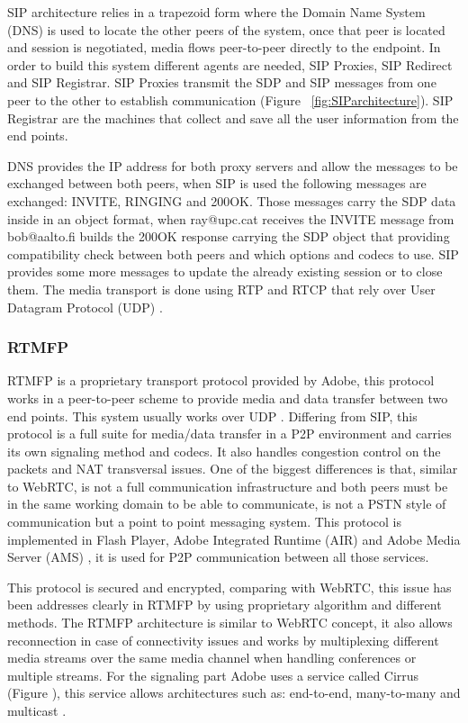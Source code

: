 SIP architecture relies in a trapezoid form where the Domain Name System (DNS) is used to locate the other peers of the system, once that peer is located and session is negotiated, media flows peer-to-peer directly to the endpoint. In order to build this system different agents are needed, SIP Proxies, SIP Redirect and SIP Registrar. SIP Proxies transmit the SDP and SIP messages from one peer to the other to establish communication (Figure ~\ref{fig:SIParchitecture}). SIP Registrar are the machines that collect and save all the user information from the end points.

DNS provides the IP address for both proxy servers and allow the messages to be exchanged between both peers, when SIP is used the following messages are exchanged: INVITE, RINGING and 200OK. Those messages carry the SDP data inside in an object format, when ray@upc.cat receives the INVITE message from bob@aalto.fi builds the 200OK response carrying the SDP object that providing compatibility check between both peers and which options and codecs to use. SIP provides some more messages to update the already existing session or to close them. The media transport is done using RTP and RTCP that rely over User Datagram Protocol (UDP) \cite{sipRFC}.

\subsubsection{RTMFP}

RTMFP is a proprietary transport protocol provided by Adobe, this protocol works in a peer-to-peer scheme to provide media and data transfer between two end points. This system usually works over UDP \cite{rtmfpSIP}. Differing from SIP, this protocol is a full suite for media/data transfer in a P2P environment and carries its own signaling method and codecs. It also handles congestion control on the packets and NAT transversal issues. One of the biggest differences is that, similar to WebRTC, is not a full communication infrastructure and both peers must be in the same working domain to be able to communicate, is not a PSTN style of communication but a point to point messaging system. This protocol is implemented in Flash Player, Adobe Integrated Runtime (AIR) and Adobe Media Server (AMS)  \cite{rtmfpSIP}, it is used for P2P communication between all those services. 

This protocol is secured and encrypted, comparing with WebRTC, this issue has been addresses clearly in RTMFP by using proprietary algorithm and different methods. The RTMFP architecture is similar to WebRTC concept, it also allows reconnection in case of connectivity issues and works by multiplexing different media streams over the same media channel when handling conferences or multiple streams. For the signaling part Adobe uses a service called Cirrus (Figure ), this service allows architectures such as: end-to-end, many-to-many and multicast \cite{cirrusFAQ}.
 
